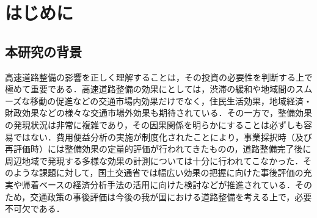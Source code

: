 \chapter{はじめに}

\section{本研究の背景}

高速道路整備の影響を正しく理解することは，その投資の必要性を判断する上で極めて重要である．高速道路整備の効果にとしては，渋滞の緩和や地域間のスムーズな移動の促進などの交通市場内効果だけでなく，住民生活効果，地域経済・財政効果などの様々な交通市場外効果も期待されている．その一方で，整備効果の発現状況は非常に複雑であり，その因果関係を明らかにすることは必ずしも容易ではない．費用便益分析の実施が制度化されたことにより，事業採択時（及び再評価時）には整備効果の定量的評価が行われてきたものの，道路整備完了後に周辺地域で発現する多様な効果の計測については十分に行われてこなかった．そのような課題に対して，国土交通省では幅広い効果の把握に向けた事後評価の充実や帰着ベースの経済分析手法の活用に向けた検討などが推進されている．そのため，交通政策の事後評価は今後の我が国における道路整備を考える上で，必要不可欠である．

